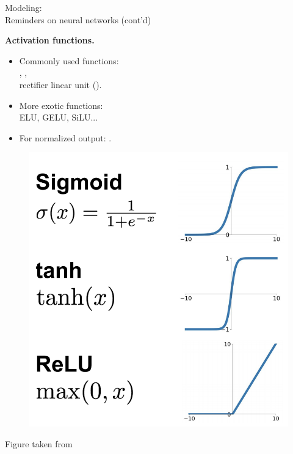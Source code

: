 \begin{frame}{Modeling:\\Reminders on neural networks (cont'd)}
\begin{minipage}{0.6\linewidth}
\textbf{Activation functions.}
\begin{itemize}
\item Commonly used functions:\\ , ,\\ rectifier linear unit ().
\item More exotic functions:\\ ELU, GELU, SiLU...
\item For normalized output: .
\end{itemize}
\end{minipage}
\hspace{-8mm}
\begin{minipage}{0.38\linewidth}
\begin{figure}
                        \centering
                        \includegraphics[width=0.95\linewidth]{./figures/activation.png}
\end{figure}
\tiny{Figure taken from }
\end{minipage}
\end{frame}

